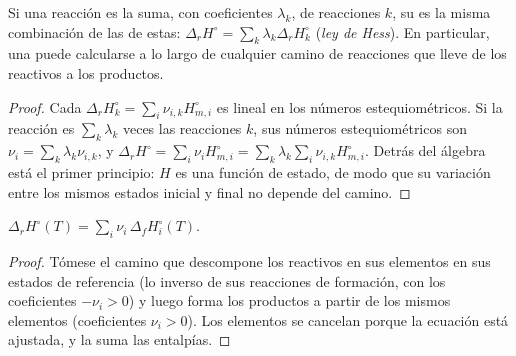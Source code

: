\begin{theorem}\label{thm:b2:reaction-enthalpy:hess}
Si una reacción es la suma, con coeficientes $\lambda_k$, de reacciones $k$,
su  es la misma combinación de las de estas:
$\Delta_r H^\circ = \sum_k\lambda_k\Delta_r H_k^\circ$
(\emph{ley de Hess}). En particular, una 
puede calcularse a lo largo de cualquier camino de reacciones que lleve de los
reactivos a los productos.
\end{theorem}

\begin{proof}
Cada $\Delta_r H_k^\circ = \sum_i\nu_{i,k}H_{m,i}^\circ$ es lineal en los
números estequiométricos. Si la reacción es $\sum_k\lambda_k$ veces las
reacciones $k$, sus números estequiométricos son $\nu_i = \sum_k\lambda_k
\nu_{i,k}$, y $\Delta_r H^\circ = \sum_i\nu_iH_{m,i}^\circ = \sum_k\lambda_k
\sum_i\nu_{i,k}H_{m,i}^\circ$. Detrás del álgebra está el primer principio: $H$ es una
función de estado, de modo que su variación entre los mismos estados inicial y final
no depende del camino.
\end{proof}

\begin{proposition}\label{prop:b2:reaction-enthalpy:formation-sum}
$\Delta_r H^\circ(T) = \sum_i\nu_i\,\Delta_f H_i^\circ(T)$.
\end{proposition}

\begin{proof}
Tómese el camino que descompone los reactivos en sus elementos en sus
estados de referencia (lo inverso de sus reacciones de formación, con los
coeficientes $-\nu_i > 0$) y luego forma los productos a partir de los mismos elementos
(coeficientes $\nu_i > 0$). Los elementos se cancelan porque la ecuación está
ajustada, y la  suma las entalpías.
\end{proof}


